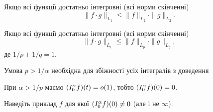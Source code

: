 \begin{remark}
    Якщо всі функції достатньо інтегровні (всі норми скінченні)
    \begin{equation}
        \|f \cdot g\|_{L_1} \le \|f\|_{L_2} \cdot \|g\|_{L_2}.  
    \end{equation}
\end{remark}

\begin{remark}
    Якщо всі функції достатньо інтегровні (всі норми скінченні)
    \begin{equation}
        \|f \cdot g\|_{L_1} \le \|f\|_{L_p} \cdot \|g\|_{L_q},  
    \end{equation}
    де $1 / p + 1 / q = 1$.
\end{remark}

\begin{remark}
    Умова $p > 1 / \alpha$ необхідна для збіжності усіх інтегралів з доведення
\end{remark}

\begin{corollary}
    При $\alpha > 1 / p$ маємо $(I_0^{\alpha} f)(t) = o(1)$, тобто $(I_0^{\alpha} f)(0) = 0$.
\end{corollary}

\begin{exercise}
    Наведіть приклад $f$ для якої $(I_0^{\alpha} f)(0) \ne 0$ (але і не $\infty$).
\end{exercise}

